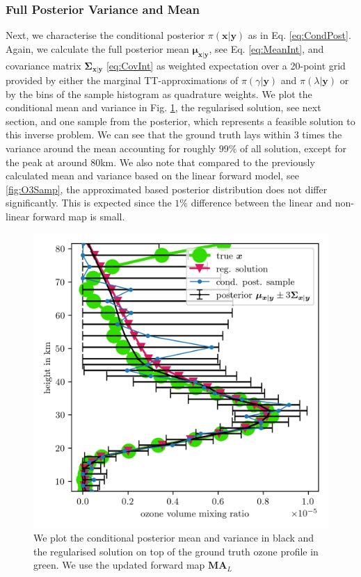 \subsubsection{Full Posterior Variance and Mean}
Next, we characterise the conditional posterior $\pi(\bm{x}|\bm{y})$ as in Eq. \ref{eq:CondPost}. 
Again, we calculate the full posterior mean $\bm{\mu}_{\bm{x}|\bm{y}}$, see Eq. \ref{eq:MeanInt}, and covariance matrix $\bm{\Sigma}_{ \bm{x}|\bm{y}}$ \ref{eq:CovInt} as weighted expectation over a 20-point grid provided by either the marginal TT-approximations of $\pi(\gamma| \bm{y})$ and $\pi(\lambda| \bm{y})$ or by the bins of the sample histogram as quadrature weights.
We plot the conditional mean and variance in Fig. \ref{fig:O3SolplsReg}, the regularised solution, see next section, and one sample from the posterior, which represents a feasible solution to this inverse problem.
We can see that the ground truth lays within 3 times the variance around the mean accounting for roughly $99 \%$ of all solution, except for the peak at around $80$km.
We also note that compared to the previously calculated mean and variance based on the linear forward model, see \ref{fig:O3Samp}, the approximated based posterior distribution does not differ significantly.
This is expected since the $1\%$ difference between the linear and non-linear forward map is small.
\begin{figure}[ht!]
	\centering
	\includegraphics{SecRecResinclRegandSampl.png}
	\caption[Ozone posterior mean and variance and the regularised solution compared to the ground truth.]{We plot the conditional posterior mean and variance in black and the regularised solution on top of the ground truth ozone profile in green. We use the updated forward map $\bm{M}\bm{A}_L$}
	\label{fig:O3SolplsReg}
\end{figure}

